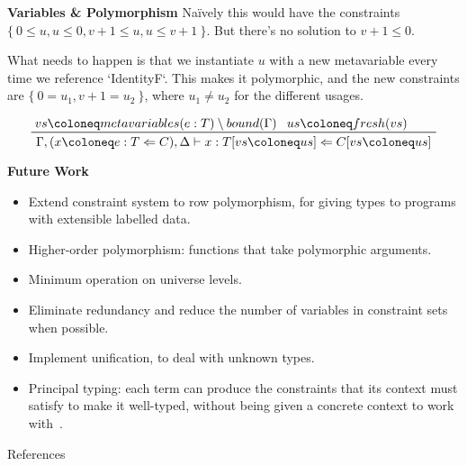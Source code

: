 \documentclass[12pt]{article}
\begin{document}
\begin{posterbard}
\begin{posterbox}{\textbf{Variables \& Polymorphism}}
Na\"ively this would have the constraints \(\{\ 0 \le u, u \le 0, v+1 \le u, u \le v+1\ \}\).
But there's no solution to \(v+1 \le 0\).

What needs to happen is that we instantiate \(u\) with a new metavariable every time we reference \inHS`IdentityF`.
This makes it polymorphic, and the new constraints are \(\{\ 0 = u_1, v+1 = u_2\ \}\), where \(u_1 \ne u_2\) for the different usages.

\begin{displaymath}
\prftree{vs \coloneq metavariables(e : T) \setminus bound(\Gamma)}{us \coloneq fresh(vs)\qquad}{\Gamma, (x \coloneq e : T \Leftarrow C), \Delta \vdash x : T[vs \coloneq us] \Leftarrow C[vs \coloneq us]}
\end{displaymath}

\end{posterbox}

\begin{posterbox}{\textbf{Future Work}}
\begin{itemize}
\item Extend constraint system to row polymorphism, for giving types to programs with extensible labelled data.
\item Higher-order polymorphism: functions that take polymorphic arguments.
\item Minimum operation on universe levels.
\item Eliminate redundancy and reduce the number of variables in constraint sets when possible.
\item Implement unification, to deal with unknown types.
\item Principal typing: each term can produce the constraints that its context must satisfy to make it well-typed, without being given a concrete context to work with~\cite{10.1145/237721.237728}\cite{10.5555/646255.684409}.
\end{itemize}
\end{posterbox}


\begin{posterbox}{References}

\end{posterbox}


\end{posterbard}
\end{document}
